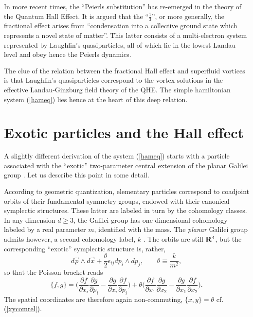 \documentclass[a4paper,12pt]{article}
\newcommand{\IR}{{\bf R}}
\newcommand{\vx}{{\vec x}}
\newcommand{\vp}{{\vec p}}
\begin{document}
In more recent times, the ``Peierls substitution'' has re-emerged 
in the theory of the Quantum Hall Effect\cite{LAUGH,GJ,QHE}.
It is argued\cite{LAUGH} that the ``$\frac{1}{3}$'', or more generally,
the fractional effect arises from  
``condensation into a collective ground state which
 represents a novel state of matter''\cite{LAUGH}.
 This latter
consists of a multi-electron system represented  by Laughlin's
 quasiparticles\cite{QHE}, all of which lie  in the lowest Landau
 level and obey hence the Peierls dynamics. 

 The clue of the relation between the fractional Hall effect and
superfluid vortices is that Laughlin's quasiparticles correspond to
 the vortex solutions in the effective Landau-Ginzburg field theory
 of the QHE\cite{ZHK}. The simple hamiltonian system 
(\ref{hameq}) lies hence at the heart of this deep relation.
\goodbreak


\section{Exotic particles and the Hall effect}

A slightly different derivation\cite{DH} of the system (\ref{hameq})
starts with  a particle associated with the ``exotic'' two-parameter 
central extension of the planar Galilei group \cite{exotic}.
Let us describe this point in some detail.

According to geometric quantization\cite{SSD,GQ}, elementary particles
correspond to coadjoint orbits of their fundamental symmetry groups,
endowed with their canonical symplectic structures. These latter are 
labeled in turn by the cohomology classes. In any dimension $d\geq3$,
the Galilei group has one-dimensional cohomology labeled by a
real parameter $m$, identified with the mass. 
The {\it planar} Galilei group admits however, a second cohomology 
label, $k$ \cite{exotic}. The orbits are still $\IR^4$, but the 
corresponding ``exotic'' symplectic structure is, rather,
\begin{equation}
    d\vp\wedge d\vx+\frac{\theta}{2}\epsilon_{ij}dp_{i}\wedge dp_{j},
    \qquad
    \theta\equiv\frac{k}{m^2},
\label{exoticsymp}
\end{equation}    
so that the Poisson bracket reads
\begin{equation}
    \big\{f, g\big\}=
    \Big(\frac{\partial f}{\partial x_{i}}\frac{\partial g}{\partial p_{i}}
    -
    \frac{\partial g}{\partial x_{i}}\frac{\partial f}{\partial p_{i}}\Big)
    +
    \theta\Big(
    \frac{\partial f}{\partial x_{1}}\frac{\partial g}{\partial x_{2}}
    -
    \frac{\partial g}{\partial x_{1}}\frac{\partial f}{\partial x_{2}}\Big).
\label{exoticPB}
\end{equation}
The spatial coordinates are therefore again non-commuting,
$
\big\{x, y\big\}=\theta
$
 cf. (\ref{xycomrel}).
 
\end{document}
